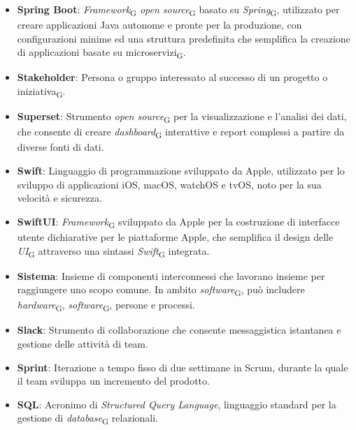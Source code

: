 \begin{itemize}
    \item \textbf{Spring Boot}: \textit{Framework}\textsubscript{G} \textit{open source}\textsubscript{G} basato su \textit{Spring}\textsubscript{G}, utilizzato per creare applicazioni Java autonome e pronte per la produzione, con configurazioni minime ed una struttura predefinita che semplifica la creazione di applicazioni basate su microservizi\textsubscript{G}.
    \item \textbf{Stakeholder}: Persona o gruppo interessato al successo di un progetto o iniziativa\textsubscript{G}.
    \item \textbf{Superset}: Strumento \textit{open source}\textsubscript{G} per la visualizzazione e l'analisi dei dati, che consente di creare \textit{dashboard}\textsubscript{G} interattive e report complessi a partire da diverse fonti di dati.
    \item \textbf{Swift}: Linguaggio di programmazione sviluppato da Apple, utilizzato per lo sviluppo di applicazioni iOS, macOS, watchOS e tvOS, noto per la sua velocità e sicurezza.
    \item \textbf{SwiftUI}: \textit{Framework}\textsubscript{G} sviluppato da Apple per la costruzione di interfacce utente dichiarative per le piattaforme Apple, che semplifica il design delle \textit{UI}\textsubscript{G} attraverso una sintassi \textit{Swift}\textsubscript{G} integrata.
    \item \textbf{Sistema}: Insieme di componenti interconnessi che lavorano insieme per raggiungere uno scopo comune. In ambito \textit{software}\textsubscript{G}, può includere \textit{hardware}\textsubscript{G}, \textit{software}\textsubscript{G}, persone e processi.
    \item \textbf{Slack}: Strumento di collaborazione che consente messaggistica istantanea e gestione delle attività di team.
    \item \textbf{Sprint}: Iterazione a tempo fisso di due settimane in Scrum, durante la quale il team sviluppa un incremento del prodotto.
    \item \textbf{SQL}: Acronimo di \textit{Structured Query Language}, linguaggio standard per la gestione di \textit{database}\textsubscript{G} relazionali.
\end{itemize}
